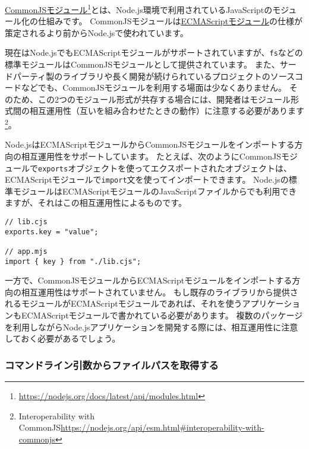 \begin{tcolorbox}[enhanced jigsaw,breakable,title=CommonJSモジュール]\label{commonjs-module}

\href{https://nodejs.org/docs/latest/api/modules.html}{CommonJSモジュール}\footnote{\url{https://nodejs.org/docs/latest/api/modules.html}}とは、Node.js環境で利用されているJavaScriptのモジュール化の仕組みです。
CommonJSモジュールは\hyperlink{module}{ECMAScriptモジュール}の仕様が策定されるより前からNode.jsで使われています。

現在はNode.jsでもECMAScriptモジュールがサポートされていますが、\texttt{fs}などの標準モジュールはCommonJSモジュールとして提供されています。
また、サードパーティ製のライブラリや長く開発が続けられているプロジェクトのソースコードなどでも、CommonJSモジュールを利用する場面は少なくありません。
そのため、この2つのモジュール形式が共存する場合には、開発者はモジュール形式間の相互運用性（互いを組み合わせたときの動作）に注意する必要があります\footnote{Interoperability with CommonJS\newline\url{https://nodejs.org/api/esm.html\#interoperability-with-commonjs}}。

Node.jsはECMAScriptモジュールからCommonJSモジュールをインポートする方向の相互運用性をサポートしています。
たとえば、次のようにCommonJSモジュールで\texttt{exports}オブジェクトを使ってエクスポートされたオブジェクトは、ECMAScriptモジュールで\texttt{import}文を使ってインポートできます。
Node.jsの標準モジュールはECMAScriptモジュールのJavaScriptファイルからでも利用できますが、それはこの相互運用性によるものです。

\begin{lstlisting}
// lib.cjs
exports.key = "value";

// app.mjs
import { key } from "./lib.cjs";
\end{lstlisting}

一方で、CommonJSモジュールからECMAScriptモジュールをインポートする方向の相互運用性はサポートされていません。
もし既存のライブラリから提供されるモジュールがECMAScriptモジュールであれば、それを使うアプリケーションもECMAScriptモジュールで書かれている必要があります。
複数のパッケージを利用しながらNode.jsアプリケーションを開発する際には、相互運用性に注意しておく必要があるでしょう。
\end{tcolorbox}

\hypertarget{get-file-path}{%
\subsubsection{コマンドライン引数からファイルパスを取得する}\label{get-file-path}}

